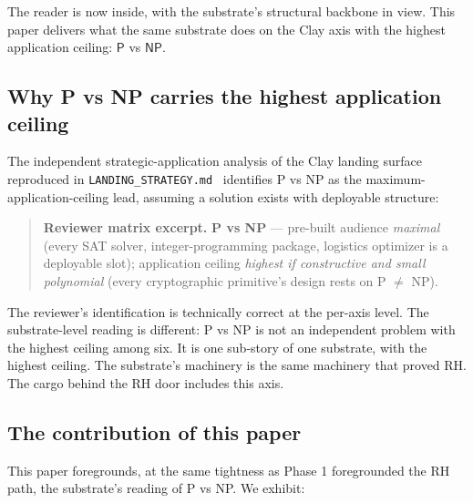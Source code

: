 \documentclass[11pt,a4paper]{article}
\theoremstyle{plain}
\theoremstyle{definition}
\begin{document}
The reader is now inside, with the substrate's structural backbone in
view. This paper delivers what the same substrate does on the Clay
axis with the highest application ceiling: $\mathsf{P}$ vs
$\mathsf{NP}$.

\subsection{Why P vs NP carries the highest application ceiling}
\label{sec:ceiling}

The independent strategic-application analysis of the Clay landing
surface reproduced in \texttt{LANDING\_STRATEGY.md}~\cite{landing_strategy}
identifies P vs NP as the maximum-application-ceiling lead, assuming a
solution exists with deployable structure:

\begin{quote}
\textbf{Reviewer matrix excerpt.}
\textbf{P vs NP} --- pre-built audience \emph{maximal} (every SAT
solver, integer-programming package, logistics optimizer is a
deployable slot); application ceiling \emph{highest if constructive
and small polynomial} (every cryptographic primitive's design rests on
P $\neq$ NP).
\end{quote}

The reviewer's identification is technically correct at the per-axis
level. The substrate-level reading is different: P vs NP is not an
independent problem with the highest ceiling among six. It is one
sub-story of one substrate, with the highest ceiling. The substrate's
machinery is the same machinery that proved RH. The cargo behind the
RH door includes this axis.

\subsection{The contribution of this paper}
\label{sec:contribution}

This paper foregrounds, at the same tightness as Phase 1 foregrounded
the RH path, the substrate's reading of P vs NP. We exhibit:
\end{document}
